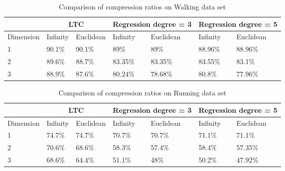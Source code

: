 \begin{table}
\begin{tabular}{|l|l|l|l|l|l|l|l|}
\hline
           & \multicolumn{2}{c|}{LTC} & \multicolumn{2}{c|}{Regression degree = 3} & \multicolumn{3}{l|}{Regression degree = 5}\\ \hline
Dimension & Infinity   & Euclidean   & Infinity    & Euclidean     & Infinity      & \multicolumn{2}{l|}{Euclidean} \\ \hline
1          & 90.1\%     & 90.1\%      & 89\%        & 89\%          & 88.96\%       & \multicolumn{2}{l|}{88.96\%}   \\ \hline
2          & 89.6\%     & 88.7\%      & 83.35\%     & 83.35\%       & 83.55\%       & \multicolumn{2}{l|}{83.1\%}    \\ \hline
3          & 88.9\%     & 87.6\%      & 80.24\%     & 78.68\%       & 80.8\%        & \multicolumn{2}{l|}{77.96\%}   \\ \hline
\end{tabular}
\caption{Comparison of compression ratios on Walking data set}
\label{table:CR-compare-walking}
\end{table}


\begin{table}
\begin{tabular}{|l|l|l|l|l|l|l|l|}
\hline
           & \multicolumn{2}{c|}{LTC} & \multicolumn{2}{c|}{Regression degree = 3} & \multicolumn{3}{l|}{Regression degree = 5}          \\ \hline
Dimension & Infinity   & Euclidean   & Infinity            & Euclidean           & Infinity& \multicolumn{2}{l|}{Euclidean} \\ \hline
1          & 74.7\%     & 74.7\%      & 70.7\%      & 70.7\%        & 71.1\%        & \multicolumn{2}{l|}{71.1\%}    \\ \hline
2          & 70.6\%     & 68.6\%      & 58.3\%      & 57.4\%        & 58.4\%        & \multicolumn{2}{l|}{57.35\%}   \\ \hline
3          & 68.6\%     & 64.4\%      & 51.1\%      & 48\%          & 50.2\%        & \multicolumn{2}{l|}{47.92\%}   \\ \hline
\end{tabular}
\caption{Comparison of compression ratios on Running data set}
\label{table:CR-compare-running}
\end{table}
